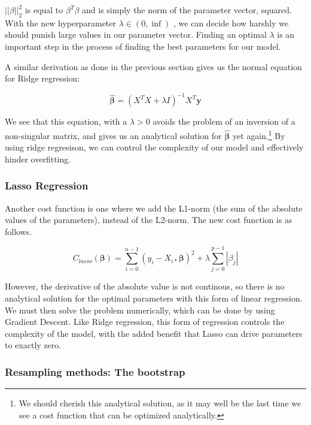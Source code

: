 \documentclass[twocolumn,10pt,cleanfoot]{asme2ej}
\begin{document}
$||\beta||_2^2$ is equal to $\beta^T\beta$ and is simply the norm of the parameter vector, squared. With the new hyperparameter $\lambda \in (0, \inf)$ , we can decide how harshly we should punish large values in our parameter vector. Finding an optimal $\lambda$ is an important step in the process of finding the best parameters for our model.

A similar derivation as done in the previous section gives us the normal equation for Ridge regression:

\begin{equation}
	\bm{\hat{\beta}} = (X^TX + \lambda I)^{-1}X^T\bm{y}
\end{equation}

We see that this equation, with a $\lambda > 0$ avoids the problem of an inversion of a non-singular matrix, and gives us an analytical solution for $\bm{\hat{\beta}}$ yet again.\footnote{We should cherish this analytical solution, as it may well be the last time we see a cost function that can be optimized analytically.} By using ridge regresison, we can control the complexity of our model and effectively hinder overfitting.

\subsubsection{Lasso Regression}

Another cost function is one where we add the L1-norm (the sum of the absolute values of the parameters), instead of the L2-norm. The new cost function is as follows.

\begin{equation}
	C_{lasso}(\bm{\beta}) = \sum_{i=0}^{n-1}(y_i-X_{i*}\bm{\beta})^2 + \lambda \sum_{j=0}^{p-1} |\beta_j|
\end{equation}

However, the derivative of the absolute value is not continous, so there is no analytical solution for the optimal parameters with this form of linear regression. We must then solve the problem numerically, which can be done by using Gradient Descent. Like Ridge regression, this form of regression controls the complexity of the model, with the added benefit that Lasso can drive parameters to exactly zero.

\subsubsection{Resampling methods: The bootstrap}
\end{document}

